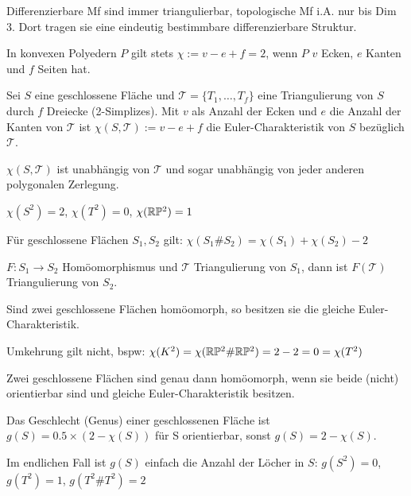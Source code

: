 \begin{bem}
	Differenzierbare Mf sind immer triangulierbar, topologische Mf i.A. nur bis Dim 3.
	Dort tragen sie eine eindeutig bestimmbare differenzierbare Struktur.
\end{bem}

\begin{satz}
	In konvexen Polyedern $P$ gilt stets $\chi := v-e+f = 2$, 
	wenn $P$ $v$ Ecken, $e$ Kanten und $f$ Seiten hat.
\end{satz}

\begin{defi}
	Sei $S$ eine geschlossene Fläche und 
	$\mathcal{T} = \{ T_1,\dots,T_f \} $ 
	eine Triangulierung von $S$ durch $f$ Dreiecke (2-Simplizes).
	Mit $v$ als Anzahl der Ecken und 
	$e$ die Anzahl der Kanten von $\mathcal{T}$ ist
	$\chi(S,\mathcal{T}) := v-e+f$ die Euler-Charakteristik 
	von $S$ bezüglich $\mathcal{T}$.
\end{defi}

\begin{satz}
	$\chi(S,\mathcal{T})$ ist unabhängig von $\mathcal{T}$ 
	und sogar unabhängig von jeder anderen polygonalen Zerlegung.
\end{satz}

\begin{bem}
	$\chi(S^2)=2$, 
	$\chi(T^2)=0$, 
	$\chi(\mathbb R\mathbb{P}^2)=1$
\end{bem}

\begin{satz}
	Für geschlossene Flächen $S_1, S_2$ gilt:
	$\chi(S_1\#S_2) = \chi(S_1) + \chi(S_2) - 2$
\end{satz}

\begin{satz}
	$F:S_1\to S_2$ Homöomorphismus und 
	$\mathcal{T}$ Triangulierung von $S_1$,
	dann ist $F(\mathcal{T})$ 
	Triangulierung von $S_2$.
\end{satz}

\begin{satz}
	Sind zwei geschlossene Flächen homöomorph,
	so besitzen sie die gleiche Euler-Charakteristik.
\end{satz}

\begin{bem}
	Umkehrung gilt nicht, bspw:
	$\chi(K^2)=\chi(\mathbb R\mathbb{P}^2\#\mathbb R\mathbb{P}^2) = 2-2 = 0 = \chi(T^2)$
\end{bem}

\begin{satz}
	Zwei geschlossene Flächen sind genau dann homöomorph,
	wenn sie beide (nicht) orientierbar sind und
	gleiche Euler-Charakteristik besitzen.
\end{satz}

\begin{defi}[Genus]
	Das Geschlecht (Genus) einer geschlossenen Fläche ist 
	$g(S) = 0.5\times(2-\chi(S))$ für S orientierbar, sonst 
	$g(S) = 2-\chi(S)$.
\end{defi}

\begin{bem}
	Im endlichen Fall ist $g(S)$ einfach 
	die Anzahl der Löcher in $S$:
	$g(S^2)=0$, $g(T^2)=1$, $g(T^2\#T^2)=2$
\end{bem}